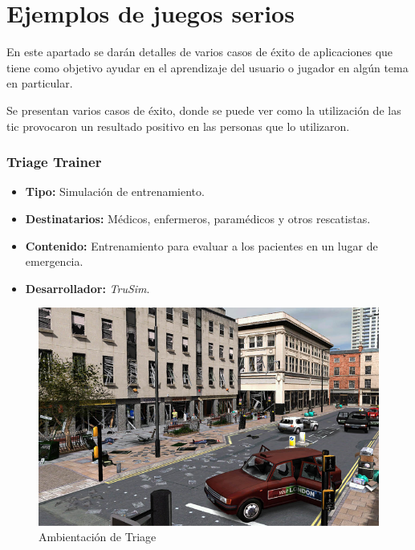 \section[Ejemplos]{Ejemplos de juegos serios}

En este apartado se darán detalles de varios casos de éxito de aplicaciones que
tiene  como objetivo ayudar en el aprendizaje del usuario o jugador en algún
tema en particular.

Se presentan varios casos de éxito, donde se puede ver como la utilización de
las \Gls{tic} provocaron un resultado positivo en las personas que lo
utilizaron.

\subsubsection{Triage Trainer}

\begin{itemize}
\item \textbf{Tipo:} Simulación de entrenamiento.
\item \textbf{Destinatarios:} Médicos, enfermeros, paramédicos y otros
    rescatistas.
\item \textbf{Contenido:} Entrenamiento para evaluar a los pacientes en un lugar de
  emergencia.
\item \textbf{Desarrollador:} \emph{TruSim}.
\end{itemize}

\begin{figure}[ht!] 
\centering 
\includegraphics[scale=0.5]{tics/images/triage.png}
\caption{Ambientación de Triage}
\label{fig:triage}
\end{figure}

